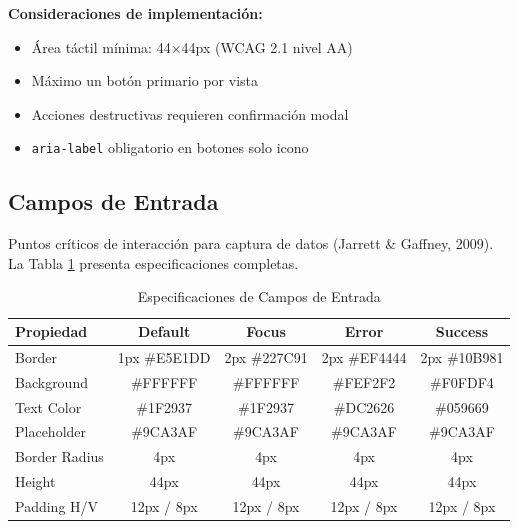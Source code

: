 \documentclass[12pt,a4paper,oneside]{article}
\begin{document}
\textbf{Consideraciones de implementación:}
\begin{itemize}
    \item Área táctil mínima: 44×44px (WCAG 2.1 nivel AA)
    \item Máximo un botón primario por vista
    \item Acciones destructivas requieren confirmación modal
    \item \texttt{aria-label} obligatorio en botones solo icono
\end{itemize}

\subsection{Campos de Entrada}

Puntos críticos de interacción para captura de datos (Jarrett \& Gaffney, 2009). La Tabla \ref{tab:inputs-specs} presenta especificaciones completas.

\begin{table}[h]
\centering
\caption{Especificaciones de Campos de Entrada}
\label{tab:inputs-specs}
\small
\begin{tabular}{|l|c|c|c|c|}
\hline
\textbf{Propiedad} & \textbf{Default} & \textbf{Focus} & \textbf{Error} & \textbf{Success} \\
\hline
Border & 1px \#E5E1DD & 2px \#227C91 & 2px \#EF4444 & 2px \#10B981 \\
\hline
Background & \#FFFFFF & \#FFFFFF & \#FEF2F2 & \#F0FDF4 \\
\hline
Text Color & \#1F2937 & \#1F2937 & \#DC2626 & \#059669 \\
\hline
Placeholder & \#9CA3AF & \#9CA3AF & \#9CA3AF & \#9CA3AF \\
\hline
Border Radius & 4px & 4px & 4px & 4px \\
\hline
Height & 44px & 44px & 44px & 44px \\
\hline
Padding H/V & 12px / 8px & 12px / 8px & 12px / 8px & 12px / 8px \\
\hline
\end{tabular}
\end{table}
\end{document}
